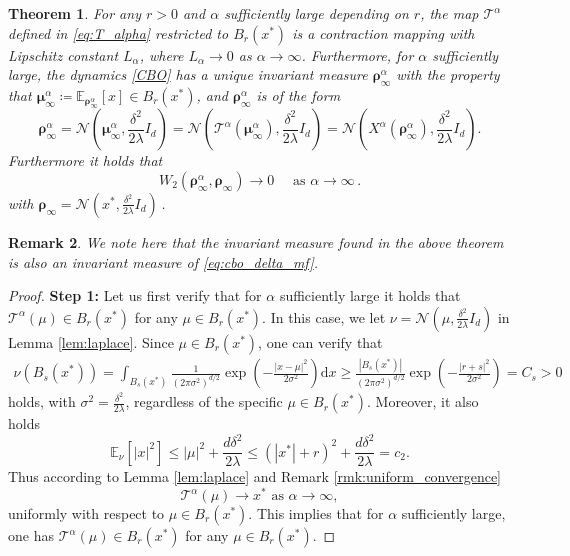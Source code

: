 \documentclass[reqno]{amsart}
\numberwithin{algorithm}{section}
\newcommand{\diff}{\mathrm{d}}
\newcommand{\EE}{{\mathbb E}}
\newcommand{\Xalpha}{{X^\alpha}}
\newcommand{\mc}[1]{\mathcal{#1}}
\newtheorem{theorem}{Theorem}[section]
\newtheorem{remark}[theorem]{Remark}
\begin{document}
{\begin{theorem}\label{thm:invariant}
    For any $r>0$ and 
    $\alpha$ sufficiently large depending on $r$,
    the map $\mc{T}^\alpha$ defined in \cref{eq:T_alpha} restricted to $B_r(x^*)$ is a contraction mapping with Lipschitz constant $L_\alpha$, where $L_\alpha\to 0$ as $\alpha\to\infty$.
    Furthermore, for $\alpha$ sufficiently large, the dynamics \eqref{CBO} has a unique invariant measure $\boldsymbol\rho_\infty^\alpha$ with the property that $\boldsymbol\mu_\infty^\alpha \coloneqq \EE_{\boldsymbol{\rho}_\infty^\alpha}[x] \in B_r(x^*)$, and $\boldsymbol{\rho}_\infty^\alpha$ is of the form
    \begin{equation}\label{eq:invariant}
        \boldsymbol\rho_\infty^\alpha=\mc{N}\left(\boldsymbol\mu_\infty^\alpha,\frac{\delta^2}{2\lambda}I_d\right)=\mc{N}\left(\mc{T}^\alpha(\boldsymbol\mu_\infty^\alpha),\frac{\delta^2}{2\lambda}I_d\right)=\mc{N}\left(\Xalpha(\boldsymbol\rho_\infty^\alpha),\frac{\delta^2}{2\lambda}I_d\right).
    \end{equation}
    Furthermore it holds that
 \begin{equation}
     W_2(\boldsymbol\rho_\infty^\alpha, \boldsymbol{\rho}_\infty)\to 0\quad \mbox{ as }\alpha\to\infty \,.
 \end{equation}
 with $\boldsymbol{\rho}_\infty= \mc{N}\left(x^*,\frac{\delta^2}{2\lambda}I_d\right)$\,.
\end{theorem}
\begin{remark}
    We note here that the invariant measure found in the above theorem is also an invariant measure of \eqref{eq:cbo_delta_mf}.
\end{remark}
\begin{proof}
\textbf{Step 1:} Let us first verify that for $\alpha$ sufficiently large it holds that  $\mathcal{T}^\alpha (\mu)\in B_r(x^*)$ for any 
$\mu\in B_r(x^*)$. In this case, we let $\nu=\mc{N}(\mu,\frac{\delta^2}{2\lambda}I_d)$ in Lemma \ref{lem:laplace}. Since $\mu\in B_r(x^*)$, one can verify that 
\begin{align}\label{lowerbound}
    \nu(B_s(x^*))=\int_{B_s(x^*)}\frac{1}{(2\pi\sigma^2)^{d/2}}\exp\left(-\frac{|x-\mu|^2}{2\sigma^2}\right) \diff x\geq \frac{|B_s(x^*)|}{(2\pi\sigma^2)^{d/2}} \exp\left(-\frac{|r+s|^2}{2\sigma^2}\right)=C_s>0
\end{align}
holds, with $\sigma^2 = \frac{\delta^2}{2\lambda}$, regardless of the specific $\mu\in B_r(x^*)$.
Moreover, it also holds
\begin{equation}
    \EE_\nu\left[|x|^2\right]\leq  |\mu|^2+\frac{d\delta^2}{2\lambda}\leq (|x^*|+r)^2+\frac{d\delta^2}{2\lambda}=c_2.
\end{equation}
Thus according to Lemma \ref{lem:laplace}  and Remark \ref{rmk:uniform_convergence}
\begin{equation}\label{Taxconv}
    \mathcal{T}^\alpha (\mu)\to x^*  \mbox{ as }\alpha\to\infty,
\end{equation}
 uniformly with respect to $\mu \in B_r(x^*)$.
This implies that for $\alpha$ sufficiently large, one has $\mathcal{T}^\alpha(\mu) \in B_r(x^*)$ for any $\mu\in B_r(x^*)$.


\end{proof}}
\end{document}
